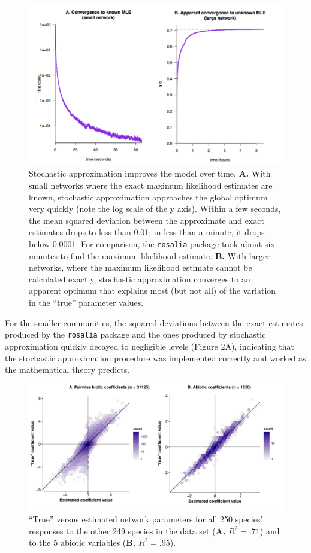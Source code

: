 \documentclass[12pt,]{article}
\begin{document}
\begin{spacing}{1.9}
\begin{flushleft}
\begin{figure}[htbp]
\centering
\includegraphics{convergence.pdf}
\caption{Stochastic approximation improves the model over time.
\textbf{A.} With small networks where the exact maximum likelihood
estimates are known, stochastic approximation approaches the global
optimum very quickly (note the log scale of the y axis). Within a few
seconds, the mean squared deviation between the approximate and exact
estimates drops to less than 0.01; in less than a minute, it drops below
0.0001. For comparison, the \texttt{rosalia} package took about six
minutes to find the maximum likelihood estimate. \textbf{B.} With larger
networks, where the maximum likelihood estimate cannot be calculated
exactly, stochastic approximation converges to an apparent optimum that
explains most (but not all) of the variation in the ``true'' parameter
values.}
\end{figure}

For the smaller communities, the squared deviations between the exact
estimates produced by the \texttt{rosalia} package and the ones produced
by stochastic approximation quickly decayed to negligible levels (Figure
2A), indicating that the stochastic approximation procedure was
implemented correctly and worked as the mathematical theory predicts.

\begin{figure}[htbp]
\centering
\includegraphics{estimates.pdf}
\caption{``True'' versus estimated network parameters for all 250
species' responses to the other 249 species in the data set (\textbf{A.}
\(R^2 = .71\)) and to the 5 abiotic variables (\textbf{B.}
\(R^2 = .95\)).}
\end{figure}


\end{flushleft}
\end{spacing}
\end{document}
